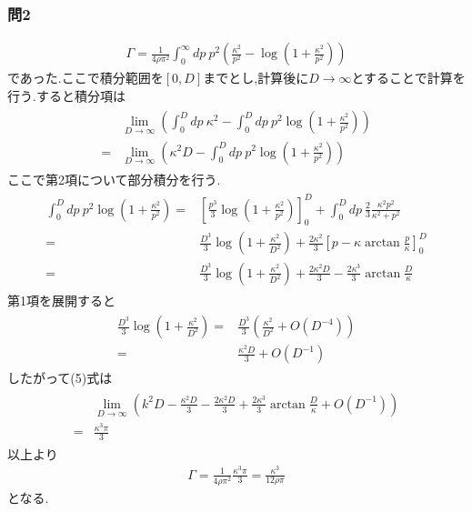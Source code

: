 \documentclass[uplatex,a4j,11pt,dvipdfmx]{jsarticle}
\begin{document}
\subsubsection*{問2}
\begin{align}
  \Gamma=\frac{1}{4\rho\pi^2}\int_0^\infty dp\ p^2\left(\frac{\kappa^2}{p^2}-\log\left(1+\frac{\kappa^2}{p^2}\right)\right)
\end{align}
であった.ここで積分範囲を$[0,D]$までとし,計算後に$D\rightarrow\infty$とすることで計算を行う.すると積分項は
\begin{align}
  \begin{split}
    &\lim_{D\rightarrow\infty}\left(\int_0^D dp\ \kappa^2-\int_0^D dp\ p^2\log\left(1+\frac{\kappa^2}{p^2}\right)\right)\\
    =&\lim_{D\rightarrow\infty}\left(\kappa^2D-\int_0^D dp\ p^2\log\left(1+\frac{\kappa^2}{p^2}\right)\right)
  \end{split}
\end{align}
ここで第2項について部分積分を行う.
\begin{align}
  \begin{split}
    \int_0^D dp\ p^2\log\left(1+\frac{\kappa^2}{p^2}\right)=&\left[\frac{p^3}{3}\log\left(1+\frac{\kappa^2}{p^2}\right)\right]_0^D+\int_0^Ddp\ \frac{2}{3}\frac{\kappa^2p^2}{\kappa^2+p^2}\\
    =&\frac{D^3}{3}\log\left(1+\frac{\kappa^2}{D^2}\right)+\frac{2\kappa^2}{3}\left[p-\kappa\arctan\frac{p}{\kappa}\right]_0^D\\
    =&\frac{D^3}{3}\log\left(1+\frac{\kappa^2}{D^2}\right)+\frac{2\kappa^2D}{3}-\frac{2\kappa^3}{3}\arctan\frac{D}{\kappa}
  \end{split}
\end{align}
第1項を展開すると
\begin{align}
  \begin{split}
    \frac{D^3}{3}\log\left(1+\frac{\kappa^2}{D^2}\right)=&\frac{D^3}{3}\left(\frac{\kappa^2}{D^2}+O(D^{-4})\right)\\
    =&\frac{\kappa^2D}{3}+O(D^{-1})
  \end{split}
\end{align}
したがって(5)式は
\begin{align}
  \begin{split}
    &\lim_{D\rightarrow\infty}\left(k^2D-\frac{\kappa^2D}{3}-\frac{2\kappa^2D}{3}+\frac{2\kappa^3}{3}\arctan\frac{D}{\kappa}+O(D^{-1})\right)\\
    =&\frac{\kappa^3\pi}{3}
  \end{split}
\end{align}
以上より
\begin{align}
  \Gamma=\frac{1}{4\rho\pi^2}\frac{\kappa^3\pi}{3}=\frac{\kappa^3}{12\rho\pi}
\end{align}
となる.
\end{document}
